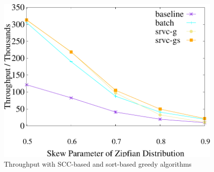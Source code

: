 \begin{figure}[t]
\begin{minipage}[b]{0.31\linewidth}
        \label{fig:fvs:latency}
    \end{minipage}
    \begin{minipage}[b]{0.31\linewidth}
        \centering
        \includegraphics[width=\textwidth]{./exp_fig/greedy/tps}
        \vspace{-2em}
        \caption{Throughput with SCC-based and sort-based greedy algorithms}
        \label{fig:greedy:tps}
    \end{minipage}
\end{figure}

